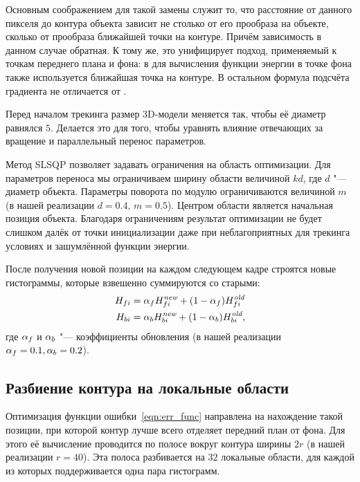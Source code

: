Основным соображением для такой замены служит то, что расстояние от данного пикселя до контура объекта зависит не столько от его прообраза на объекте, сколько от прообраза ближайшей точки на контуре.
Причём зависимость в данном случае обратная.
К тому же, это унифицирует подход, применяемый к точкам переднего плана и фона: в \cite{Tjaden2018} для вычисления функции энергии в точке фона также используется ближайшая точка на контуре.
В остальном формула подсчёта градиента не отличается от \cite{Tjaden2018}.

Перед началом трекинга размер 3D-модели меняется так, чтобы её диаметр равнялся
$5$.
Делается это для того, чтобы уравнять влияние отвечающих за вращение и
параллельный перенос параметров.

Метод SLSQP позволяет задавать ограничения на область оптимизации.
Для параметров переноса мы ограничиваем ширину области величиной $kd$,
где $d$ "--- диаметр объекта.
Параметры поворота по модулю ограничиваются величиной $m$ (в нашей реализации $d
=0.4$, $m = 0.5$).
Центром области является начальная позиция объекта.
Благодаря ограничениям результат оптимизации не будет слишком далёк от точки
инициализации даже при неблагоприятных для трекинга условиях и зашумлённой
функции энергии.

После получения новой позиции на каждом следующем кадре строятся новые
гистограммы, которые взвешенно суммируются со старыми:
\begin{align}
    H_{fi} &= \alpha_{f} H_{fi}^{\text{\it new}} + (1 - \alpha_{f})
        H_{fi}^{\text{\it old}} \\
    H_{bi} &= \alpha_{b} H_{bi}^{\text{\it new}} + (1 - \alpha_{b})
        H_{bi}^{\text{\it old}}
\text{,}
\end{align}
где $\alpha_{f}$ и $\alpha_{b}$ "--- коэффициенты обновления (в нашей реализации
$\alpha_{f} = 0.1, \alpha_{b} = 0.2$).

\subsection{Разбиение контура на локальные области}\label{local-areas}

Оптимизация функции ошибки~\ref{eqn:err_func} направлена на нахождение такой
позиции, при которой контур лучше всего отделяет передний план от фона.
Для этого её вычисление проводится по полосе вокруг контура ширины $2r$ (в нашей
реализации $r = 40$).
Эта полоса разбивается на $32$ локальные области, для каждой из
которых поддерживается одна пара гистограмм.

